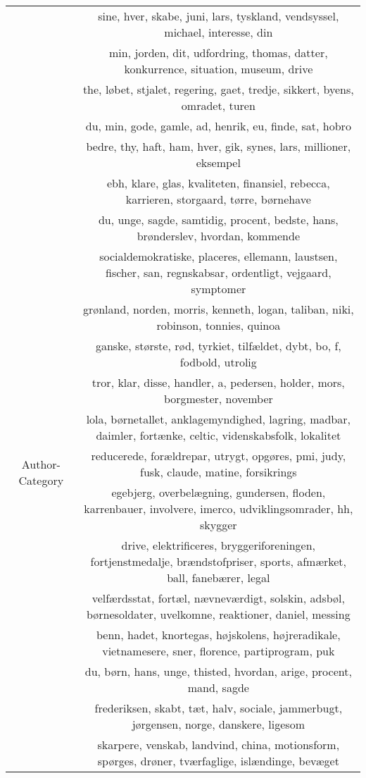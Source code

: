 \begin{table}
\begin{tabular}{c|c}
		& sine, hver, skabe, juni, lars, tyskland, vendsyssel, michael, interesse, din \\
		& min, jorden, dit, udfordring, thomas, datter, konkurrence, situation, museum, drive \\
		& the, løbet, stjalet, regering, gaet, tredje, sikkert, byens, omradet, turen \\
		& du, min, gode, gamle, ad, henrik, eu, finde, sat, hobro \\
		& bedre, thy, haft, ham, hver, gik, synes, lars, millioner, eksempel \\
		\midrule
		\multirow{15}{*}{Author-Category} & ebh, klare, glas, kvaliteten, finansiel, rebecca, karrieren, storgaard, tørre, børnehave \\
		& du, unge, sagde, samtidig, procent, bedste, hans, brønderslev, hvordan, kommende \\
		& socialdemokratiske, placeres, ellemann, laustsen, fischer, san, regnskabsar, ordentligt, vejgaard, symptomer \\
		& grønland, norden, morris, kenneth, logan, taliban, niki, robinson, tonnies, quinoa \\
		& ganske, største, rød, tyrkiet, tilfældet, dybt, bo, f, fodbold, utrolig \\
		& tror, klar, disse, handler, a, pedersen, holder, mors, borgmester, november \\
		& lola, børnetallet, anklagemyndighed, lagring, madbar, daimler, fortænke, celtic, videnskabsfolk, lokalitet \\
		& reducerede, forældrepar, utrygt, opgøres, pmi, judy, fusk, claude, matine, forsikrings \\
		& egebjerg, overbelægning, gundersen, floden, karrenbauer, involvere, imerco, udviklingsomrader, hh, skygger \\
		& drive, elektrificeres, bryggeriforeningen, fortjenstmedalje, brændstofpriser, sports, afmærket, ball, fanebærer, legal \\
		& velfærdsstat, fortæl, nævneværdigt, solskin, adsbøl, børnesoldater, uvelkomne, reaktioner, daniel, messing \\
		& benn, hadet, knortegas, højskolens, højreradikale, vietnamesere, sner, florence, partiprogram, puk \\
		& du, børn, hans, unge, thisted, hvordan, arige, procent, mand, sagde \\
		& frederiksen, skabt, tæt, halv, sociale, jammerbugt, jørgensen, norge, danskere, ligesom \\
		& skarpere, venskab, landvind, china, motionsform, spørges, drøner, tværfaglige, islændinge, bevæget \\
	\end{tabular}
\end{table}